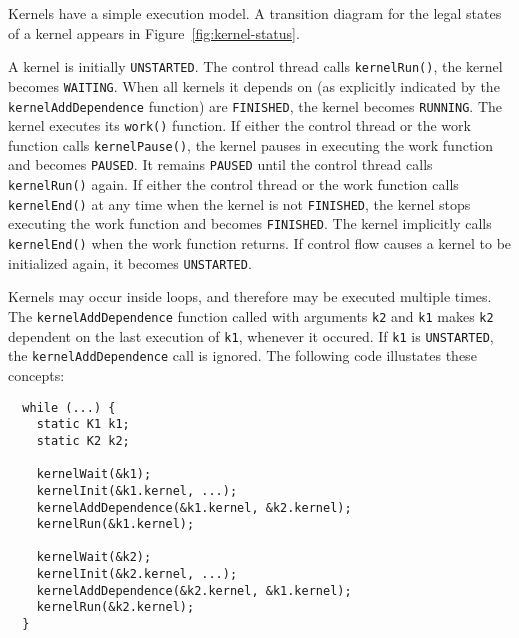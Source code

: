 

\begin{figure}[t]
\end{figure}

Kernels have a simple execution model. A transition diagram for the legal states of a kernel appears in Figure~\ref{fig:kernel-status}.

A kernel is initially {\tt UNSTARTED}. 
The control thread calls {\tt kernelRun()}, the kernel becomes {\tt WAITING}. When all kernels it depends on (as explicitly indicated by 
the {\tt kernelAddDependence} function) are {\tt FINISHED}, the kernel becomes {\tt RUNNING}. The kernel executes its {\tt work()} function. 
If either the control thread or the work function calls {\tt kernelPause()}, the kernel pauses in executing the work function and becomes {\tt PAUSED}. It remains {\tt PAUSED} until the control thread calls {\tt kernelRun()} again. If either the control thread or the work function calls {\tt kernelEnd()} at any time when the kernel is not {\tt FINISHED}, the kernel stops executing the work function and becomes {\tt FINISHED}. The kernel implicitly calls {\tt kernelEnd()} when the work function returns. If control flow causes a kernel to be initialized again, it becomes {\tt UNSTARTED}.

Kernels may occur inside loops, and therefore may be executed multiple times.  The {\tt kernelAddDependence} function called with arguments {\tt k2} and {\tt k1} makes {\tt k2} dependent on the last execution of {\tt k1}, whenever it occured. If {\tt k1} is {\tt UNSTARTED}, the {\tt kernelAddDependence} call is ignored. The following code illustates these concepts:

{\small
\begin{verbatim}
  while (...) {
    static K1 k1;
    static K2 k2;

    kernelWait(&k1);
    kernelInit(&k1.kernel, ...);
    kernelAddDependence(&k1.kernel, &k2.kernel);
    kernelRun(&k1.kernel);

    kernelWait(&k2);
    kernelInit(&k2.kernel, ...);
    kernelAddDependence(&k2.kernel, &k1.kernel);
    kernelRun(&k2.kernel);
  }
\end{verbatim}}

